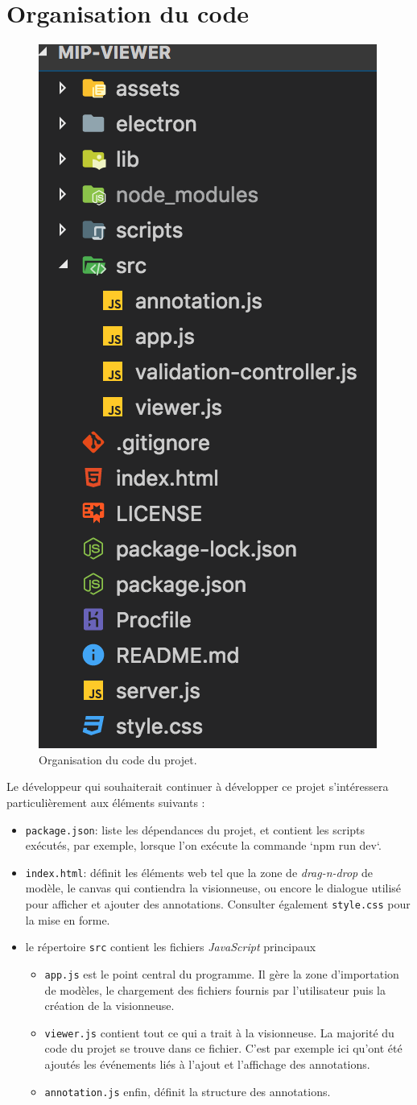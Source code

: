 \section{Organisation du code}

\begin{figure}[h]
    \centering
    \includegraphics[width=0.25\linewidth]{Figures/mip-viewer-project-structure.png}
    \caption{Organisation du code du projet.}
    \label{fig:mip-viewer-project-structure}
\end{figure}

Le développeur qui souhaiterait continuer à développer ce projet s'intéressera particulièrement aux éléments suivants :

\begin{itemize}
    \item \texttt{package.json}: liste les dépendances du projet, et contient les scripts exécutés, par exemple, lorsque l'on exécute la commande `npm run dev`.
    \item \texttt{index.html}: définit les éléments web tel que la zone de \textit{drag-n-drop} de modèle, le canvas qui contiendra la visionneuse, ou encore le dialogue utilisé pour afficher et ajouter des annotations. Consulter également \texttt{style.css} pour la mise en forme.
    \item le répertoire \texttt{src} contient les fichiers \textit{JavaScript} principaux
    \begin{itemize}
        \item \texttt{app.js} est le point central du programme. Il gère la zone d'importation de modèles, le chargement des fichiers fournis par l'utilisateur puis la création de la visionneuse.
        \item \texttt{viewer.js} contient tout ce qui a trait à la visionneuse. La majorité du code du projet se trouve dans ce fichier. C'est par exemple ici qu'ont été ajoutés les événements liés à l'ajout et l'affichage des annotations.
        \item \texttt{annotation.js} enfin, définit la structure des annotations.
    \end{itemize}
\end{itemize}
